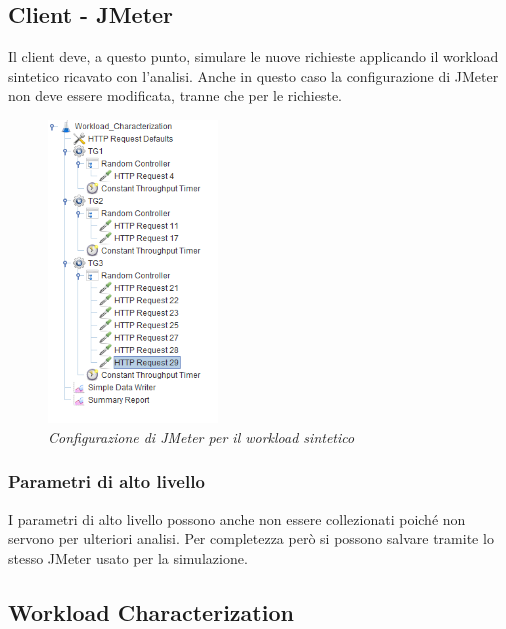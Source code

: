 \subsection{Client - JMeter}
Il client deve, a questo punto, simulare le nuove richieste applicando il workload sintetico ricavato con l'analisi. Anche in questo caso la configurazione di JMeter non deve essere modificata, tranne che per le richieste.
\begin{figure}[H]
	\centering
	\includegraphics[width=0.4\textwidth]{img/hw3/jmeter_sintetico.png}
	\caption{\textit{Configurazione di JMeter per il workload sintetico}}
\end{figure}

\subsubsection{Parametri di alto livello}
I parametri di alto livello possono anche non essere collezionati poiché non servono per ulteriori analisi. Per completezza però si possono salvare tramite lo stesso JMeter usato per la simulazione.


\subsection{Workload Characterization}
